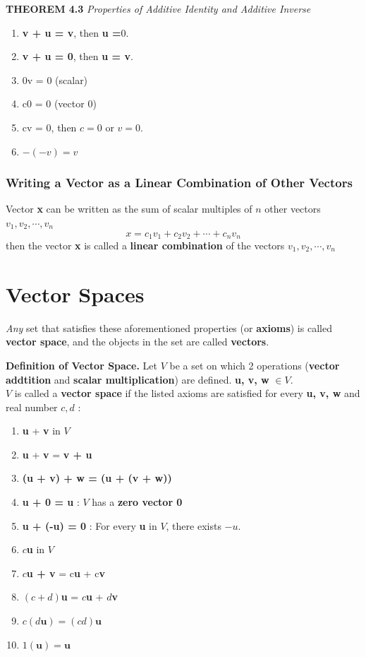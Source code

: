 \documentclass{article}
\newcommand\B{\textbf}
\newcommand\tcl{\begin{tcolorbox}[colback = {blue9}]}
\newcommand\etcl{\end{tcolorbox}}
\begin{document}
    \tcl
    \B{THEOREM 4.3 }\quad \textit{Properties of Additive Identity and Additive Inverse}
    \begin{enumerate}
        \item \B{v + u = v}, then \B{u =}$0$.
        \item \B{v + u = 0}, then \B{u = v}.
        \item 0v = 0 (scalar)
        \item c0 = 0 (vector $0$)
        \item cv = 0, then $c = 0$ or $v = 0$.
        \item $-(-v) = v$
    \end{enumerate}
    \etcl

    \subsubsection*{Writing a Vector as a Linear Combination of Other Vectors}

    Vector \B{x} can be written as the sum of scalar multiples of $n$ other vectors \B{$v_1, v_2, \cdots, v_n$}
    \[ x = c_1v_1 + c_2v_2 + \cdots + c_nv_n \]
    then the vector \B{x} is called a \B{linear combination} of the vectors \B{$v_1, v_2, \cdots, v_n$} 

    \section{Vector Spaces}
    
    \textit{Any} set that satisfies these aforementioned properties (or \B{axioms}) is called \B{vector space},
    and the objects in the set are called \B{vectors}.

    \B{Definition of Vector Space.} Let $V$ be a set on which 2 operations (\B{vector addtition} and 
    \B{scalar multiplication}) are defined. \B{u, v, w} $\in V$.\\
    $V$ is called a \B{vector space} if the listed axioms are satisfied for every \B{u, v, w} and
    real number $c, d$ :
    \tcl
    \begin{enumerate}
        \item 
            \B{u} + \B{v} in $V$
        \item \B{u}  + \B{v} = \B{v + u}
        \item \B{(u + v) + w = (u + (v + w))}
        \item \B{u + 0 = u} : $V$ has a \B{zero vector 0}
        \item \B{u + (-u) = 0} : For every \B{u} in $V$, there exists $-u$.
        \item $c$\B{u} in $V$
        \item $c$\B{u + v} = c\B{u} + c\B{v}
        \item $(c + d)$\B{u} = $c$\B{u} + $d$\B{v}
        \item $c(d\B{u}) = (cd)\B{u}$
        \item $1(\B{u}) = \B{u}$
    \end{enumerate}
    \etcl
\end{document}
